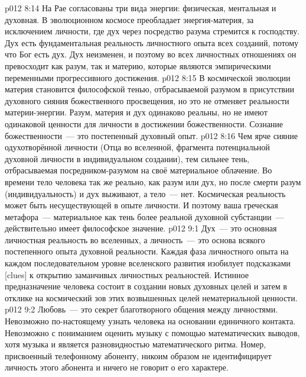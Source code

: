 \vs p012 8:14 \pc На Рае согласованы три вида энергии: физическая, ментальная и духовная. В эволюционном космосе преобладает энергия\hyp{}материя, за исключением личности, где дух через посредство разума стремится к господству. Дух есть фундаментальная реальность личностного опыта всех созданий, потому что Бог есть дух. Дух неизменен, и поэтому во всех личностных отношениях он превосходит как разум, так и материю, которые являются эмпирическими переменными прогрессивного достижения.
\vs p012 8:15 В космической эволюции материя становится философской тенью, отбрасываемой разумом в присутствии духовного сияния божественного просвещения, но это не отменяет реальности материи\hyp{}энергии. Разум, материя и дух одинаково реальны, но не имеют одинаковой ценности для личности в достижении божественности. Сознание божественности~--- это постепенный духовный опыт.
\vs p012 8:16 Чем ярче сияние одухотворённой личности (Отца во вселенной, фрагмента потенциальной духовной личности в индивидуальном создании), тем сильнее тень, отбрасываемая посредником\hyp{}разумом на своё материальное облачение. Во времени тело человека так же реально, как разум или дух, но после смерти разум (индивидуальность) и дух выживают, а тело~--- нет. Космическая реальность может быть несуществующей в опыте личности. И поэтому ваша греческая метафора~--- материальное как тень более реальной духовной субстанции~--- действительно имеет философское значение.
\vs p012 9:1 Дух~--- это основная личностная реальность во вселенных, а личность~--- это основа всякого постепенного опыта духовной реальности. Каждая фаза личностного опыта на каждом последовательном уровне вселенского развития изобилует подсказками [clues] к открытию заманчивых личностных реальностей. Истинное предназначение человека состоит в создании новых духовных целей и затем в отклике на космический зов этих возвышенных целей нематериальной ценности.
\vs p012 9:2 \pc Любовь~--- это секрет благотворного общения между личностями. Невозможно по\hyp{}настоящему узнать человека на основании единичного контакта. Невозможно с пониманием оценить музыку с помощью математических выводов, хотя музыка и является разновидностью математического ритма. Номер, присвоенный телефонному абоненту, никоим образом не идентифицирует личность этого абонента и ничего не говорит о его характере.
